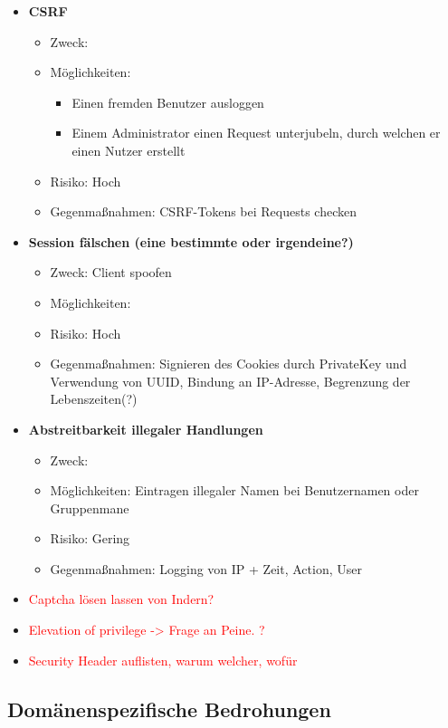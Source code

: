 \documentclass[12pt,DIV14,BCOR10mm,a4paper,twoside,parskip=half-,headsepline,headinclude,english,ngerman,bibliography=totocnumbered]{scrreprt}
\begin{document}
\begin{itemize}
  \item \textbf{CSRF}
  \begin{itemize}
  \item Zweck:
  \item Möglichkeiten:
  \begin{itemize}
          \item Einen fremden Benutzer ausloggen
          \item Einem Administrator einen Request unterjubeln, durch welchen er einen Nutzer erstellt
      \end{itemize}
  \item Risiko: Hoch
  \item Gegenmaßnahmen: CSRF-Tokens bei Requests checken
  \end{itemize}

  \item \textbf{Session fälschen (eine bestimmte oder irgendeine?)}
  \begin{itemize}
  \item Zweck: Client spoofen
  \item Möglichkeiten:
  \item Risiko: Hoch
  \item Gegenmaßnahmen: Signieren des Cookies durch PrivateKey und Verwendung von UUID, Bindung an IP-Adresse, Begrenzung der Lebenszeiten(?)
  \end{itemize}

  \item \textbf{Abstreitbarkeit illegaler Handlungen}
  \begin{itemize}
  \item Zweck:
  \item Möglichkeiten: Eintragen illegaler Namen bei Benutzernamen oder Gruppenmane
  \item Risiko: Gering
  \item Gegenmaßnahmen: Logging von IP + Zeit, Action, User
  \end{itemize}

  \item \textcolor{red}{Captcha lösen lassen von Indern?}
  \item \textcolor{red}{Elevation of privilege -> Frage an Peine. ?}
  \item \textcolor{red}{Security Header auflisten, warum welcher, wofür}
\end{itemize}

\subsection{Domänenspezifische Bedrohungen}
\end{document}
